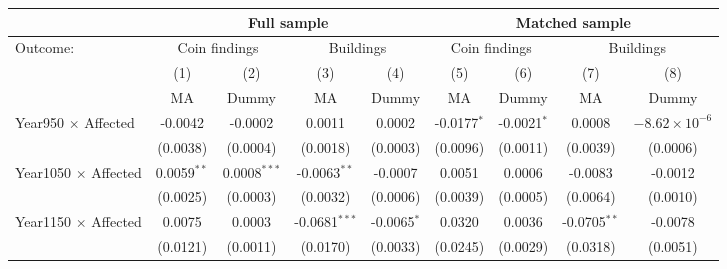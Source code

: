 \begin{tabular}{lcccccccc}
   \tabularnewline \midrule \midrule
                                                    & \multicolumn{4}{c}{Full sample}                                                    & \multicolumn{4}{c}{Matched sample} \\
   \midrule
   Outcome:                                         & \multicolumn{2}{c}{Coin findings} & \multicolumn{2}{c}{Buildings}                  & \multicolumn{2}{c}{Coin findings}               & \multicolumn{2}{c}{Buildings}\\
                                                    & (1)             & (2)             & (3)                   & (4)                    & (5)                    & (6)                    & (7)            & (8)\\  
                                                    & MA              & Dummy           & MA                    & Dummy                  & MA                     & Dummy                  & MA             & Dummy \\ 
   \midrule
   Year950 $\times$ Affected                        & -0.0042         & -0.0002         & 0.0011                & 0.0002                 & -0.0177$^{*}$          & -0.0021$^{*}$          & 0.0008          & $-8.62\times 10^{-6}$\\    
                                                    & (0.0038)        & (0.0004)        & (0.0018)              & (0.0003)               & (0.0096)               & (0.0011)               & (0.0039)        & (0.0006)\\   
   Year1050 $\times$ Affected                       & 0.0059$^{**}$   & 0.0008$^{***}$  & -0.0063$^{**}$        & -0.0007                & 0.0051                 & 0.0006                 & -0.0083         & -0.0012\\   
                                                    & (0.0025)        & (0.0003)        & (0.0032)              & (0.0006)               & (0.0039)               & (0.0005)               & (0.0064)        & (0.0010)\\   
   Year1150 $\times$ Affected                       & 0.0075          & 0.0003          & -0.0681$^{***}$       & -0.0065$^{*}$          & 0.0320                 & 0.0036                 & -0.0705$^{**}$  & -0.0078\\   
                                                    & (0.0121)        & (0.0011)        & (0.0170)              & (0.0033)               & (0.0245)               & (0.0029)               & (0.0318)        & (0.0051)\\   

\end{tabular}
